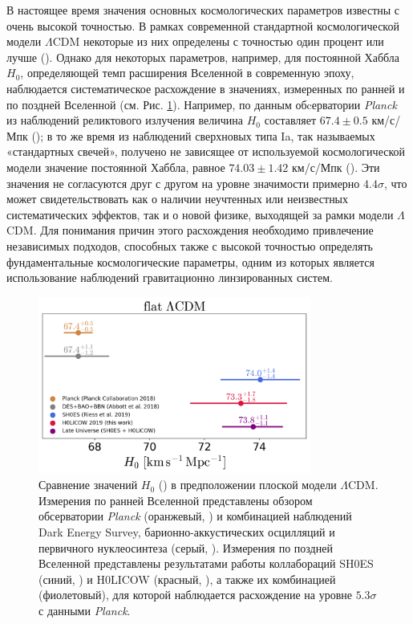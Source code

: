 В настоящее время значения основных космологических параметров известны с очень высокой точностью. В рамках современной стандартной космологической модели $\Lambda$CDM некоторые из них определены с точностью один процент или лучше (\cite{planck2018}). Однако для некоторых параметров, например, для постоянной Хаббла $H_0$, определяющей  темп расширения Вселенной в современную эпоху, наблюдается систематическое расхождение в значениях,  измеренных по ранней и по поздней Вселенной (см. Рис. \ref{fig:h0s}). Например, по данным обcерватории \textit{Planck} из наблюдений реликтового излучения величина $H_0$ составляет $67.4 \pm 0.5$ км/с/Мпк (\cite{planck2018}); в то же время из наблюдений сверхновых типа Ia, так называемых «стандартных свечей», получено не зависящее от используемой космологической модели значение постоянной Хаббла, равное $74.03 \pm 1.42$ км/с/Мпк (\cite{riess2019}).  Эти значения не согласуются друг с другом на уровне значимости примерно $4.4\sigma$, что может свидетельствовать как о наличии неучтенных или неизвестных систематических эффектов, так и о новой физике, выходящей за рамки модели $\Lambda$CDM. Для понимания причин этого расхождения необходимо привлечение независимых подходов, способных также с высокой точностью определять фундаментальные космологические параметры, одним из которых является использование наблюдений гравитационно линзированных систем.

\begin{figure}[h]
    \centering
	\includegraphics[width=0.80\textwidth]{pics/h0s.png}
	\caption{Сравнение значений $H_0$ (\cite{holicowXIII}) в предположении плоской модели $\Lambda$CDM. Измерения по ранней Вселенной представлены обзором обсерватории \textit{Planck} (оранжевый, \cite{planck2018}) и комбинацией наблюдений Dark Energy Survey, барионно-аккустических осцилляций и первичного нуклеосинтеза (серый, \cite{abbott2018b}). Измерения по поздней Вселенной представлены результатами работы коллабораций SH0ES (синий, \cite{riess2019}) и H0LICOW (красный, \cite{holicowXIII}), а также их комбинацией (фиолетовый), для которой наблюдается расхождение на уровне $5.3\sigma$ с данными \textit{Planck}.}
	\label{fig:h0s}
\end{figure} 

